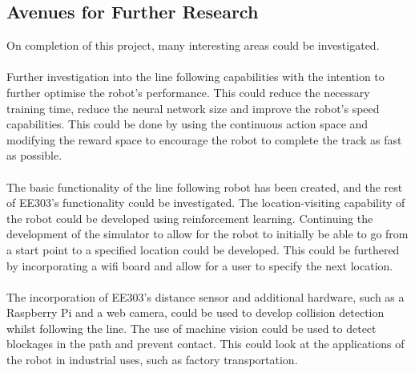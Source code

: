 \documentclass[a4paper,12pt]{article}
\begin{document}
\subsection{Avenues for Further Research}
On completion of this project, many interesting areas could be investigated. 
\\\\
Further investigation into the line following capabilities with the intention to further optimise the robot's performance. This could reduce the necessary training time, reduce the neural network size and improve the robot's speed capabilities. This could be done by using the continuous action space and modifying the reward space to encourage the robot to complete the track as fast as possible.  
\\\\
The basic functionality of the line following robot has been created, and the rest of EE303's functionality could be investigated. The location-visiting capability of the robot could be developed using reinforcement learning. Continuing the development of the simulator to allow for the robot to initially be able to go from a start point to a specified location could be developed. This could be furthered by incorporating a wifi board and allow for a user to specify the next location. 
\\\\
The incorporation of EE303's distance sensor and additional hardware, such as a Raspberry Pi and a web camera, could be used to develop collision detection whilst following the line. The use of machine vision could be used to detect blockages in the path and prevent contact. This could look at the applications of the robot in industrial uses, such as factory transportation.

\pagebreak
\end{document}
